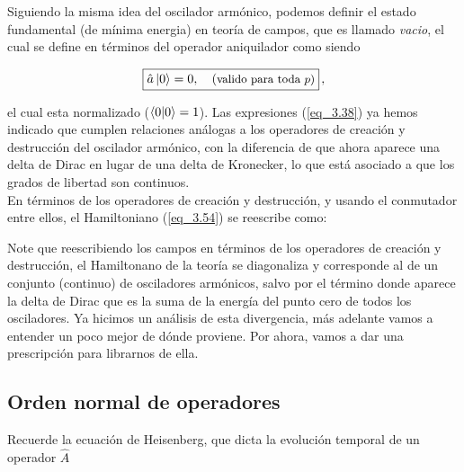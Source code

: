 Siguiendo la misma idea del oscilador armónico, podemos definir el estado fundamental (de mínima energia) en teoría de campos, que es llamado \emph{vacio}, el cual se define en términos del operador aniquilador como siendo

\begin{equation}
    \boxed{
    \hat{a} \ket{0} = 0, \quad \text{(\small valido para toda $p$)} } \, ,
    \label{eq_3.57}
\end{equation}

el cual esta normalizado ($\braket{0}=1$). Las expresiones (\ref{eq_3.38}) ya hemos indicado que cumplen relaciones análogas a los operadores de creación y destrucción del oscilador armónico, con la diferencia de que ahora aparece una delta de Dirac en lugar de una delta de Kronecker, lo que está asociado a que los grados de libertad son continuos.\\

En términos de los operadores de creación y destrucción, y usando el conmutador entre ellos, el Hamiltoniano (\ref{eq_3.54}) se reescribe como:


Note que reescribiendo los campos en términos de los operadores de creación y
destrucción, el Hamiltonano de la teoría se diagonaliza y corresponde al de un conjunto (continuo) de osciladores armónicos, salvo por el término donde aparece la delta de Dirac que es la suma de la energía del punto cero de todos los osciladores. Ya hicimos un análisis de esta divergencia, más adelante vamos a entender un poco mejor de dónde proviene. Por ahora, vamos a dar una prescripción para librarnos de ella.

\subsection{Orden normal de operadores}

\newcommand{\OA}{\hat{A}}
Recuerde la ecuación de Heisenberg, que dicta la evolución temporal de un operador $\hat{A}$

